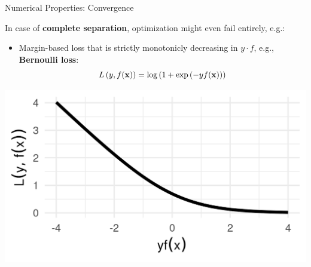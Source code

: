 \documentclass[11pt,compress,t,notes=noshow, xcolor=table]{beamer}
\begin{document}



\begin{vbframe}{Numerical Properties: Convergence}

\footnotesize

In case of \textbf{complete separation}, optimization might even 
fail entirely, e.g.:

\vspace{0.5cm}

\begin{minipage}{0.7\textwidth}
  \begin{itemize}
    \item Margin-based loss that is strictly monotonicly decreasing in
    $y \cdot f$, e.g., \textbf{Bernoulli loss}: 
    $$L\left(y, f(\mathbf{x})\right) = \log \left( 1 + \exp \left( - y  f(\mathbf{x}) \right)\right)$$
  \end{itemize}
\end{minipage}%
\begin{minipage}{0.05\textwidth}
  \phantom{foo}
\end{minipage}%
\begin{minipage}{0.25\textwidth}
  \includegraphics[width=\textwidth]{figure/plot_bernoulli}
\end{minipage}%


\end{vbframe}
\end{document}
